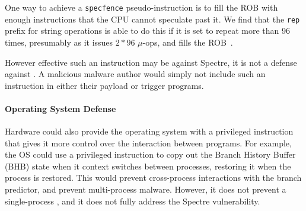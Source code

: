 One way to achieve a \texttt{specfence} pseudo-instruction is to fill the ROB
with enough instructions that the CPU cannot speculate past it. We find that the
\texttt{rep} prefix for string operations is able to do this if it is set to 
repeat more than 96 times, presumably as it issues $2*96$ $\mu$-ops, and fills the
ROB~\cite{intel-instruction-tables}.

However effective such an instruction may be against Spectre, it is not a
defense against \speculake. A malicious \speculake malware author would simply
not include such an instruction in either their payload or trigger programs.


\paragraph{Operating System Defense}
Hardware could also provide the operating system with a privileged instruction
that gives it more control over the interaction between programs. For example,
the OS could use a privileged instruction to copy out the Branch History Buffer
(BHB) state when it context switches between processes, restoring it when the
process is restored. This would prevent cross-process interactions with the
branch predictor, and prevent multi-process \speculake malware. However, it does
not prevent a single-process \speculake, and it does not fully address the
Spectre vulnerability.


%
%
%

